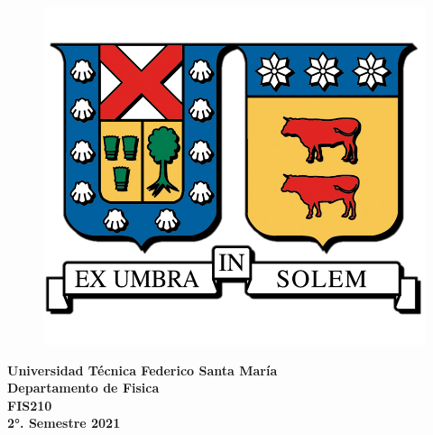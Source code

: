 \documentclass[12pt]{article}
\begin{document}
\begin{flushleft}
    \begin{figure}[t]
    \raggedright
\includegraphics[scale=0.2]{Logo_UTFSM.png}
    \label{fig:imagen}
\end{figure}
\end{flushleft}

\begin{flushright}
\vspace{-4cm}
\hspace{8cm}
\textbf{Universidad Técnica Federico Santa María\\
\hspace{9cm}Departamento de \textbf{Fisica}\\
\hspace{9cm}FIS210\\
\hspace{9cm}2°. Semestre 2021}
\end{flushright}
\end{document}
